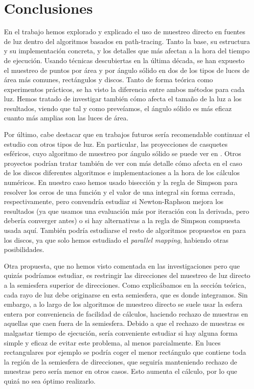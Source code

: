 \documentclass{scrbook}
\begin{document}

\chapter{Conclusiones}
En el trabajo hemos explorado y explicado el uso de muestreo directo en fuentes de luz dentro del algoritmos basados en path-tracing. Tanto la base, su estructura y su implementación concreta, y los detalles que más afectan a la hora del tiempo de ejecución. Usando técnicas descubiertas en la última década, se han expuesto el muestreo de puntos por área y por ángulo sólido en dos de los tipos de luces de área más comunes, rectángulos y discos. Tanto de forma teórica como experimentos prácticos, se ha visto la diferencia entre ambos métodos para cada luz. Hemos tratado de investigar también cómo afecta el tamaño de la luz a los resultados, viendo que tal y como preveíamos, el ángulo sólido es más eficaz cuanto más amplias son las luces de área.

Por último, cabe destacar que en trabajos futuros sería recomendable continuar el estudio con otros tipos de luz. En particular, las proyecciones de casquetes esféricos, cuyo algoritmo de muestreo por ángulo sólido se puede ver en \cite{ur2018}. Otros proyectos podrían tratar también de ver con más detalle cómo afecta en el caso de los discos diferentes algoritmos e implementaciones a la hora de los cálculos numéricos. En nuestro caso hemos usado bisección y la regla de Simpson para resolver los ceros de una función y el valor de una integral sin forma cerrada, respectivamente, pero convendría estudiar si Newton-Raphson mejora los resultados (ya que usamos una evaluación más por iteración con la derivada, pero debería converger antes) o si hay alternativas a la regla de Simpson compuesta usada aquí. También podría estudiarse el resto de algoritmos propuestos en \cite{ur2017} para los discos, ya que solo hemos estudiado el \textit{parallel mapping}, habiendo otras posibilidades.

Otra propuesta, que no hemos visto comentada en las investigaciones pero que quizás podríamos estudiar, es  restringir las direcciones del muestreo de luz directo a la semiesfera superior de direcciones. Como explicábamos en la sección teórica, cada rayo de luz debe originarse en esta semiesfera, que es donde integramos. Sin embargo, a lo largo de los algoritmos de muestreo directo se suele usar la esfera entera por conveniencia de facilidad de cálculos, haciendo rechazo de muestras en aquellas que caen fuera de la semiesfera. Debido a que el rechazo de muestras es malgastar tiempo de ejecución, sería conveniente estudiar si hay alguna forma simple y eficaz de evitar este problema, al menos parcialmente. En luces rectangulares por ejemplo se podría coger el menor rectángulo que contiene toda la región de la semiesfera de direcciones, que seguiría manteniendo rechazo de muestras pero sería menor en otros casos. Esto aumenta el cálculo, por lo que quizá no sea óptimo realizarlo. 
\end{document}
